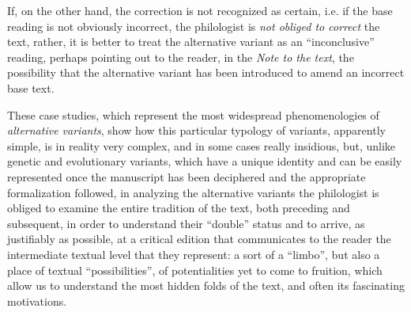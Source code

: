 \documentclass{article}
\begin{document}
\noindent If, on the other hand, the correction is not recognized as certain, i.e.
if the base reading is not obviously incorrect, the philologist is
\emph{not obliged to correct} the text, rather, it is better to
treat the alternative variant as an ``inconclusive'' reading, perhaps
pointing out to the reader, in the \emph{Note to the text}, the
possibility that the alternative variant has been introduced to amend an
incorrect base text.

These case studies, which represent the most widespread phenomenologies
of \emph{alternative variants}, show how this particular typology of
variants, apparently simple, is in reality very complex, and in some
cases really insidious, but, unlike genetic and evolutionary variants,
which have a unique identity and can be easily represented once the
manuscript has been deciphered and the appropriate formalization
followed, in analyzing the alternative variants the philologist is
obliged to examine the entire tradition of the text, both preceding and
subsequent, in order to understand their ``double'' status and to arrive,
as justifiably as possible, at a critical edition that communicates to
the reader the intermediate textual level that they represent: a sort of
a ``limbo'', but also a place of textual ``possibilities'', of
potentialities yet to come to fruition, which allow us to understand the
most hidden folds of the text, and often its fascinating motivations.

\begin{flushleft}
    \renewcommand*{\mkbibnamefamily}[1]{\textsc{#1}}
    \renewcommand*{\mkbibnamegiven}[1]{\textsc{#1}} 
\printbibliography
\end{flushleft}
\end{document}
